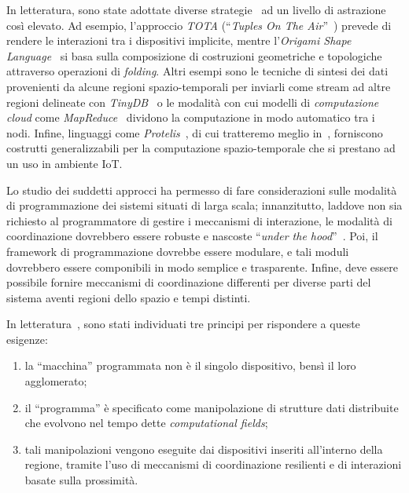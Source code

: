 In letteratura, sono state adottate diverse strategie~\cite{7274429} ad un livello di astrazione così elevato.
Ad esempio, l'approccio \emph{TOTA} (``\emph{Tuples On The Air}''~\cite{10.1145/1538942.1538945}) prevede di rendere le interazioni tra i dispositivi implicite,
mentre l'\emph{Origami Shape Language}~\cite{nagpal2001programmable} si basa sulla composizione di costruzioni geometriche e topologiche attraverso operazioni di \emph{folding}.
Altri esempi sono le tecniche di sintesi dei dati provenienti da alcune regioni spazio-temporali per inviarli come stream ad altre regioni delineate con \emph{TinyDB}~\cite{1017485}
o le modalità con cui modelli di \emph{computazione cloud} come \emph{MapReduce}~\cite{10.1145/1327452.1327492} dividono la computazione in modo automatico tra i nodi.
Infine, linguaggi come \emph{Protelis}~\cite{PianiniSASOTutorial2017}, di cui tratteremo meglio in~, forniscono costrutti generalizzabili per la computazione spazio-temporale che si prestano ad un uso in ambiente IoT.

Lo studio dei suddetti approcci ha permesso di fare considerazioni sulle modalità di programmazione dei sistemi situati di larga scala;
innanzitutto, laddove non sia richiesto al programmatore di gestire i meccanismi di interazione, le modalità di coordinazione dovrebbero essere robuste e nascoste ``\emph{under the hood}''~\cite{7274429}.
Poi, il framework di programmazione dovrebbe essere modulare, e tali moduli dovrebbero essere componibili in modo semplice e trasparente.
Infine, deve essere possibile fornire meccanismi di coordinazione differenti per diverse parti del sistema aventi regioni dello spazio e tempi distinti.

In letteratura~\cite{7274429}, sono stati individuati tre principi %
per rispondere a queste esigenze:

\begin{enumerate}
  \item la ``macchina'' programmata non è il singolo dispositivo, bensì il loro agglomerato; %
  \item il ``programma'' è specificato come manipolazione di strutture dati distribuite che evolvono nel tempo dette \emph{computational fields};
  \item tali manipolazioni vengono eseguite dai dispositivi inseriti all'interno della regione, tramite l'uso di meccanismi di coordinazione resilienti e di interazioni basate sulla prossimità.
\end{enumerate}

